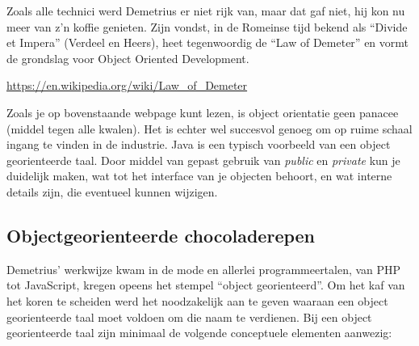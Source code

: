 \documentclass[a4paper,10pt]{article}
\begin{document}
\begin{framed}
Zoals alle technici werd Demetrius er niet rijk van,
maar dat gaf niet, hij kon nu meer van z'n koffie genieten.
Zijn vondst, in de Romeinse tijd bekend als ``Divide et Impera'' (Verdeel en Heers),
heet tegenwoordig de ``Law of Demeter'' en vormt de grondslag voor Object Oriented Development.

\url{https://en.wikipedia.org/wiki/Law_of_Demeter}

Zoals je op bovenstaande webpage kunt lezen, is object orientatie geen panacee (middel tegen alle kwalen).
Het is echter wel succesvol genoeg om op ruime schaal ingang te vinden in de industrie.
Java is een typisch voorbeeld van een object georienteerde taal.
Door middel van gepast gebruik van \emph{public} en \emph{private} kun je duidelijk maken,
wat tot het interface van je objecten behoort, en wat interne details zijn, die eventueel kunnen wijzigen.
\end{framed}

\subsection*{Objectgeorienteerde chocoladerepen}

Demetrius' werkwijze kwam in de mode en allerlei programmeertalen, van PHP tot JavaScript, kregen opeens het stempel ``object georienteerd''.
Om het kaf van het koren te scheiden werd het noodzakelijk aan te geven waaraan een object georienteerde taal moet voldoen om die naam te verdienen.
Bij een object georienteerde taal zijn minimaal de volgende conceptuele elementen aanwezig:
\end{document}
